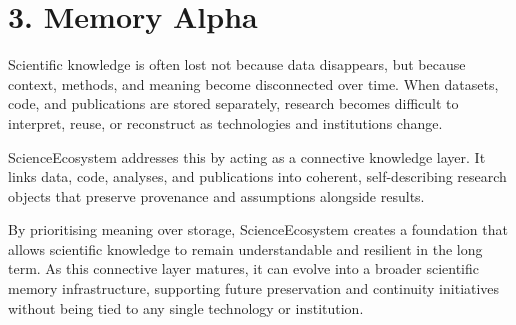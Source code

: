 \section*{3. Memory Alpha}
Scientific knowledge is often lost not because data disappears, but because context, 
methods, and meaning become disconnected over time. When datasets, code, 
and publications are stored separately, research becomes difficult to interpret, 
reuse, or reconstruct as technologies and institutions change.

ScienceEcosystem addresses this by acting as a connective knowledge layer. 
It links data, code, analyses, and publications into coherent, 
self-describing research objects that preserve provenance and assumptions alongside results.

By prioritising meaning over storage, ScienceEcosystem creates a foundation that allows 
scientific knowledge to remain understandable and resilient in the long term. 
As this connective layer matures, it can evolve into a broader scientific memory infrastructure, 
supporting future preservation and continuity initiatives without being tied to any single 
technology or institution.


